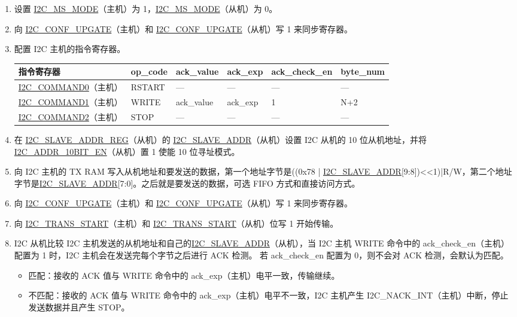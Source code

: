 \documentclass[main\_\_CN.tex]{subfiles}
\begin{document}
\begin{enumerate}
\item 设置 \hyperref[fielddesc:I2CMSMODE]{I2C\_MS\_MODE}（主机）为 1，\hyperref[fielddesc:I2CMSMODE]{I2C\_MS\_MODE}（从机）为 0。
\item 向 \hyperref[fielddesc:I2CCONFUPGATE]{I2C\_CONF\_UPGATE}（主机）和 \hyperref[fielddesc:I2CCONFUPGATE]{I2C\_CONF\_UPGATE}（从机）写 1 来同步寄存器。
\item 配置 I2C 主机的指令寄存器。

\begin{longtable}{ | p{4cm} | p{2cm} | p{2cm} | p{2cm} |p{2cm} | p{2cm} |}
\hline\rowcolor{lightgray}
指令寄存器& op\_code & ack\_value&ack\_exp&ack\_check\_en&byte\_num  \\ \hline
\hyperref[fielddesc:I2CCOMMAND0]{I2C\_COMMAND0}（主机）& RSTART& ---&---&---&---  \\ \hline
\hyperref[fielddesc:I2CCOMMAND1]{I2C\_COMMAND1}（主机）& WRITE& ack\_value&ack\_exp&1&N+2  \\ \hline
\hyperref[fielddesc:I2CCOMMAND2]{I2C\_COMMAND2}（主机）& STOP& ---&---&---&---  \\ \hline
\end{longtable}

\item 在 \hyperref[regdesc:I2CSLAVEADDRREG]{I2C\_SLAVE\_ADDR\_REG}（从机）的 \hyperref[fielddesc:I2CSLAVEADDR]{I2C\_SLAVE\_ADDR}（从机）设置 I2C 从机的 10 位从机地址，并将 \hyperref[fielddesc:I2CADDR10BITEN]{I2C\_ADDR\_10BIT\_EN}（从机）置 1 使能 10 位寻址模式。
\item 向 I2C 主机的 TX RAM 写入从机地址和要发送的数据，第一个地址字节是((0x78 | \hyperref[fielddesc:I2CSLAVEADDR]{I2C\_SLAVE\_ADDR}[9:8])<<1)|R/W，第二个地址字节是\hyperref[fielddesc:I2CSLAVEADDR]{I2C\_SLAVE\_ADDR}[7:0]。之后就是要发送的数据，可选 FIFO 方式和直接访问方式。
\item 向 \hyperref[fielddesc:I2CCONFUPGATE]{I2C\_CONF\_UPGATE}（主机）和 \hyperref[fielddesc:I2CCONFUPGATE]{I2C\_CONF\_UPGATE}（从机）写 1 来同步寄存器。
\item 向 \hyperref[fielddesc:I2CTRANSSTART]{I2C\_TRANS\_START}（主机）和 \hyperref[fielddesc:I2CTRANSSTART]{I2C\_TRANS\_START}（从机）位写 1 开始传输。
\item I2C 从机比较 I2C 主机发送的从机地址和自己的\hyperref[fielddesc:I2CSLAVEADDR]{I2C\_SLAVE\_ADDR}（从机），当 I2C 主机 WRITE 命令中的 ack\_check\_en（主机）配置为 1 时，I2C 主机会在发送完每个字节之后进行 ACK 检测。 若 ack\_check\_en 配置为 0，则不会对 ACK 检测，会默认为匹配。
\begin{itemize}
\item 匹配：接收的 ACK 值与 WRITE 命令中的 ack\_exp（主机）电平一致，传输继续。
\item 不匹配：接收的 ACK 值与 WRITE 命令中的 ack\_exp（主机）电平不一致，I2C 主机产生 I2C\_NACK\_INT（主机）中断，停止发送数据并且产生 STOP。
\end{itemize}


\end{enumerate}
\end{document}
